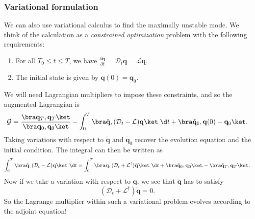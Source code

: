 \documentclass[a4paper]{article}
\begin{document}
%

\subsubsection*{Variational formulation}
We can also use variational calculus to find the maximally unstable mode. We think of the calculation as a \emph{constrained optimization} problem with the following requirements:
\begin{enumerate}
  \item For all $T_0 \leq t \leq T$, we have $\frac{\partial \mathbf{q}}{\partial t} = \mathcal{D}_t \mathbf{q} = \mathcal{L} \mathbf{q}$.
  \item The initial state is given by $\mathbf{q}(0) = \mathbf{q}_0$.
\end{enumerate}
We will need Lagrangian multipliers to impose these constraints, and so the augmented Lagrangian is
\[
  \mathcal{G} = \frac{\bra \mathbf{q}_T, \mathbf{q}_T\ket}{\bra \mathbf{q}_0, \mathbf{q}_0\ket} - \int_0^T \bra \tilde{\mathbf{q}},  (\mathcal{D}_t - \mathcal{L}) \mathbf{q}\ket \;\d t + \bra \tilde{\mathbf{q}}_0, \mathbf{q}(0) - \mathbf{q}_0\ket.
\]
Taking variations with respect to $\tilde{\mathbf{q}}$ and $\tilde{\mathbf{q}}_0$ recover the evolution equation and the initial condition. The integral can then be written as
\[
  \int_0^T \bra \tilde{\mathbf{q}}, (\mathcal{D}_t - \mathcal{L})\mathbf{q}\ket \;\d t = \int_0^T \bra \mathbf{q}, (\mathcal{D}_t + \mathcal{L}^\dagger) \tilde{\mathbf{q}}\ket \;\d t + \bra \tilde{\mathbf{q}}_0, \mathbf{q}_0\ket - \bra \tilde{\mathbf{q}}_T, \mathbf{q}_T\ket.
\]
Now if we take a variation with respect to $\mathbf{q}$, we see that $\tilde{\mathbf{q}}$ has to satisfy
\[
  (\mathcal{D}_t + \mathcal{L}^\dagger) \tilde{\mathbf{q}} = 0.
\]
So the Lagrange multiplier within such a variational problem evolves according to the adjoint equation!
\end{document}
